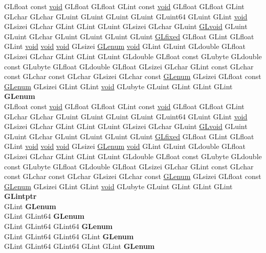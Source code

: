\begin{DoxyCompactItemize}
\begin{tabbing}
\>GLfloat const \hyperlink{interfacevoid}{void} GLfloat GLfloat GLint const \hyperlink{interfacevoid}{void} GLfloat GLfloat GLint GLchar GLchar GLuint GLuint GLuint GLuint GLuint64 GLuint GLint \hyperlink{interfacevoid}{void} GLsizei GLchar GLint GLint GLuint GLsizei GLchar GLuint \hyperlink{interfacevoid}{GLvoid} GLuint GLuint GLchar GLuint GLuint GLuint GLuint \hyperlink{glheader_8h_ad6d3fa892df40dedf48ee6d84529ae5e}{GLfixed} GLfloat GLint GLfloat GLint \hyperlink{interfacevoid}{void} \hyperlink{interfacevoid}{void} \hyperlink{interfacevoid}{void} GLsizei \hyperlink{interfacevoid}{GLenum} \hyperlink{interfacevoid}{void} GLint GLuint GLdouble GLfloat GLsizei GLchar GLint GLint GLuint GLdouble GLfloat const GLubyte GLdouble const GLubyte GLfloat GLdouble GLfloat GLsizei GLchar GLint const GLchar const GLchar const GLchar GLsizei GLchar const \hyperlink{interfacevoid}{GLenum} GLsizei GLfloat const \hyperlink{interfacevoid}{GLenum} GLsizei GLint GLint \hyperlink{interfacevoid}{void} GLubyte GLuint GLint GLint GLint {\bfseries GLenum}\\
\>GLfloat const \hyperlink{interfacevoid}{void} GLfloat GLfloat GLint const \hyperlink{interfacevoid}{void} GLfloat GLfloat GLint GLchar GLchar GLuint GLuint GLuint GLuint GLuint64 GLuint GLint \hyperlink{interfacevoid}{void} GLsizei GLchar GLint GLint GLuint GLsizei GLchar GLuint \hyperlink{interfacevoid}{GLvoid} GLuint GLuint GLchar GLuint GLuint GLuint GLuint \hyperlink{glheader_8h_ad6d3fa892df40dedf48ee6d84529ae5e}{GLfixed} GLfloat GLint GLfloat GLint \hyperlink{interfacevoid}{void} \hyperlink{interfacevoid}{void} \hyperlink{interfacevoid}{void} GLsizei \hyperlink{interfacevoid}{GLenum} \hyperlink{interfacevoid}{void} GLint GLuint GLdouble GLfloat GLsizei GLchar GLint GLint GLuint GLdouble GLfloat const GLubyte GLdouble const GLubyte GLfloat GLdouble GLfloat GLsizei GLchar GLint const GLchar const GLchar const GLchar GLsizei GLchar const \hyperlink{interfacevoid}{GLenum} GLsizei GLfloat const \hyperlink{interfacevoid}{GLenum} GLsizei GLint GLint \hyperlink{interfacevoid}{void} GLubyte GLuint GLint GLint GLint {\bfseries GLintptr}\\
\>GLint {\bfseries GLenum}\\
\>GLint GLint64 {\bfseries GLenum}\\
\>GLint GLint64 GLint64 {\bfseries GLenum}\\
\>GLint GLint64 GLint64 GLint {\bfseries GLenum}\\
\>GLint GLint64 GLint64 GLint GLint {\bfseries GLenum}\\

\end{tabbing}
\end{DoxyCompactItemize}
